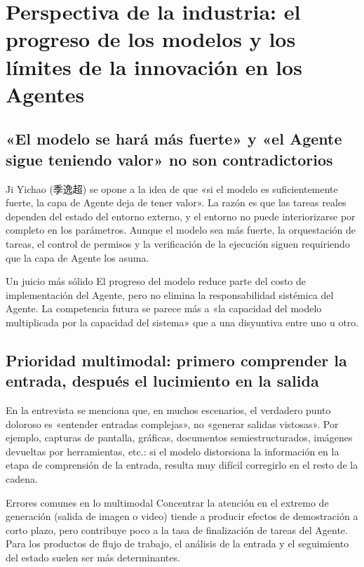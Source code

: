 \section{Perspectiva de la industria: el progreso de los modelos y los límites de la innovación en los Agentes}

\subsection{«El modelo se hará más fuerte» y «el Agente sigue teniendo valor» no son contradictorios}

Ji Yichao (季逸超) se opone a la idea de que «si el modelo es suficientemente fuerte, la capa de Agente deja de tener valor». La razón es que las tareas reales dependen del estado del entorno externo, y el entorno no puede interiorizarse por completo en los parámetros. Aunque el modelo sea más fuerte, la orquestación de tareas, el control de permisos y la verificación de la ejecución siguen requiriendo que la capa de Agente los asuma.

\begin{importantbox}{Un juicio más sólido}
El progreso del modelo reduce parte del costo de implementación del Agente, pero no elimina la responsabilidad sistémica del Agente. La competencia futura se parece más a «la capacidad del modelo multiplicada por la capacidad del sistema» que a una disyuntiva entre uno u otro.
\end{importantbox}

\subsection{Prioridad multimodal: primero comprender la entrada, después el lucimiento en la salida}

En la entrevista se menciona que, en muchos escenarios, el verdadero punto doloroso es «entender entradas complejas», no «generar salidas vistosas». Por ejemplo, capturas de pantalla, gráficas, documentos semiestructurados, imágenes devueltas por herramientas, etc.: si el modelo distorsiona la información en la etapa de comprensión de la entrada, resulta muy difícil corregirlo en el resto de la cadena.

\begin{warningbox}{Errores comunes en lo multimodal}
Concentrar la atención en el extremo de generación (salida de imagen o video) tiende a producir efectos de demostración a corto plazo, pero contribuye poco a la tasa de finalización de tareas del Agente. Para los productos de flujo de trabajo, el análisis de la entrada y el seguimiento del estado suelen ser más determinantes.
\end{warningbox}

